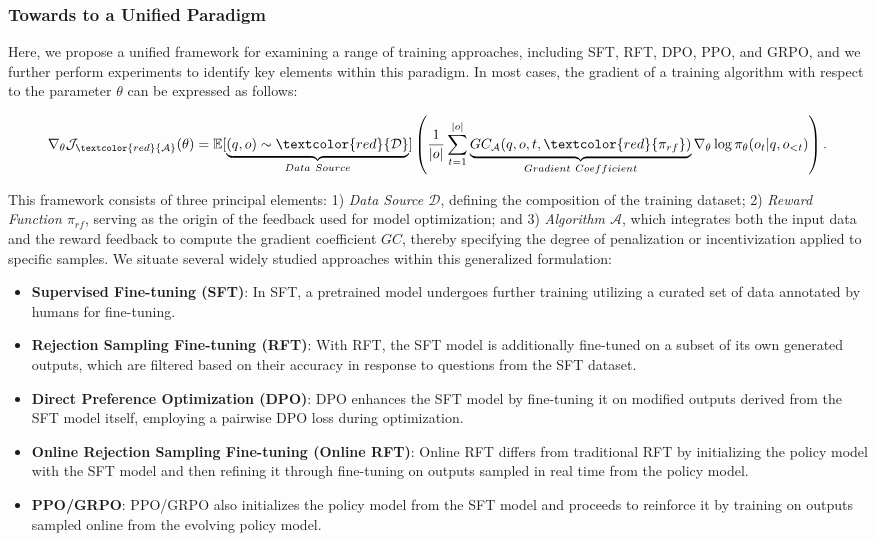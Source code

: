\begin{itemize}[topsep=0pt]
\begin{itemize}[topsep=0pt]
\subsubsection{Towards to a Unified Paradigm} Here, we propose a unified framework for examining a range of training approaches, including SFT, RFT, DPO, PPO, and GRPO, and we further perform experiments to identify key elements within this paradigm. In most cases, the gradient of a training algorithm with respect to the parameter $\theta$ can be expressed as follows:

\begin{equation}
    \nabla_{\theta}\mathcal{J}_{\textcolor{red}{\mathcal{A}}}(\theta) = \mathbb{E}[\underbrace{(q,o) \sim \textcolor{red}{\mathcal{D}}}_{Data \ Source}]\left( \frac{1}{|o|} \sum_{t=1}^{|o|}  \underbrace{GC_{{\mathcal{A}}}(q, o, t, \textcolor{red}{\pi_{{rf}}})}_{Gradient \ Coefficient}  \nabla_{\theta}\log \pi_{\theta}(o_t | q, o_{<t})\right).
\label{eq:objective}
\end{equation}

This framework consists of three principal elements: 1) \textit{Data Source $\mathcal{D}$}, defining the composition of the training dataset; 2) \textit{Reward Function $\pi_{{rf}}$}, serving as the origin of the feedback used for model optimization; and 3) \textit{Algorithm $\mathcal{A}$}, which integrates both the input data and the reward feedback to compute the gradient coefficient $GC$, thereby specifying the degree of penalization or incentivization applied to specific samples. We situate several widely studied approaches within this generalized formulation:

\begin{itemize}
    \item  \textbf{Supervised Fine-tuning (SFT)}: In SFT, a pretrained model undergoes further training utilizing a curated set of data annotated by humans for fine-tuning.
    \item \textbf{Rejection Sampling Fine-tuning (RFT)}: With RFT, the SFT model is additionally fine-tuned on a subset of its own generated outputs, which are filtered based on their accuracy in response to questions from the SFT dataset.
    \item \textbf{Direct Preference Optimization (DPO)}: DPO enhances the SFT model by fine-tuning it on modified outputs derived from the SFT model itself, employing a pairwise DPO loss during optimization.
    \item \textbf{Online Rejection Sampling Fine-tuning (Online RFT)}: Online RFT differs from traditional RFT by initializing the policy model with the SFT model and then refining it through fine-tuning on outputs sampled in real time from the policy model.
    \item \textbf{PPO/GRPO}: PPO/GRPO also initializes the policy model from the SFT model and proceeds to reinforce it by training on outputs sampled online from the evolving policy model.
\end{itemize}


\end{itemize}
\end{itemize}
